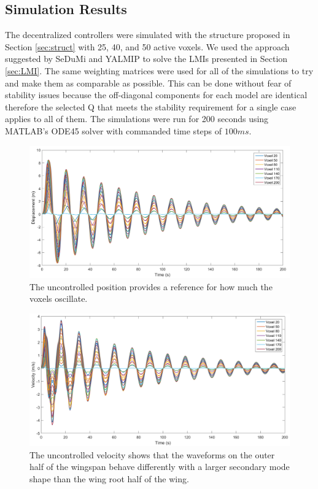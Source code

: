 \documentclass[11pt]{ucthesis}
\begin{document}
\subsection{Simulation Results}
\label{sec:results}

The decentralized controllers were simulated with the structure proposed in Section \ref{sec:struct} with 25, 40, and 50 active voxels. We used the approach suggested by SeDuMi and YALMIP \cite{lofberg2004yalmip} to solve the LMIs presented in Section \ref{sec:LMI}. The same weighting matrices were used for all of the simulations to try and make them as comparable as possible. This can be done without fear of stability issues because the off-diagonal components for each model are identical therefore the selected Q that meets the stability requirement for a single case applies to all of them. The simulations were run for 200 seconds using MATLAB's ODE45 solver with commanded time steps of $100ms$.

\begin{figure}[thpb]
\centering
\includegraphics[width=0.75\linewidth]{Figures/LMIUncontrolDisplacement.png}
\caption{The uncontrolled position provides a reference for how much the voxels oscillate.}
\label{fig:UCPos}
\end{figure}

\begin{figure}[thpb]
\centering
\includegraphics[width=0.75\linewidth]{Figures/LMIUncontrolVelocity.png}
\caption{The uncontrolled velocity shows that the waveforms on the outer half of the wingspan behave differently with a larger secondary mode shape than the wing root half of the wing.}
\label{fig:UCVel}
\end{figure}
\end{document}
